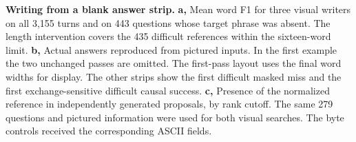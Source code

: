 \textbf{Writing from a blank answer strip.} \textbf{a,} Mean word F1 for three visual writers on all 3,155 turns and on 443 questions whose target phrase was absent. The length intervention covers the 435 difficult references within the sixteen-word limit. \textbf{b,} Actual answers reproduced from pictured inputs. In the first example the two unchanged passes are omitted. The first-pass layout uses the final word widths for display. The other strips show the first difficult masked miss and the first exchange-sensitive difficult causal success. \textbf{c,} Presence of the normalized reference in independently generated proposals, by rank cutoff. The same 279 questions and pictured information were used for both visual searches. The byte controls received the corresponding ASCII fields.
